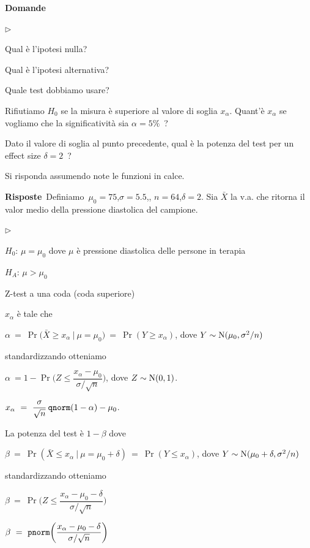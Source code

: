 \documentclass[11pt,openany]{book}
\newcommand{\mylabel}[1]{{\footnotesize\textsf{#1}}\hfill}
\renewenvironment{itemize}
  {\begin{list}{$\triangleright$}{%
   \setlength{\parskip}{0mm}
   \setlength{\topsep}{.2\baselineskip}
   \setlength{\rightmargin}{0mm}
   \setlength{\listparindent}{0mm}
   \setlength{\itemindent}{0mm}
   \setlength{\labelwidth}{3ex}
   \setlength{\itemsep}{.4\baselineskip}
   \setlength{\parsep}{0mm}
   \setlength{\partopsep}{0mm}
   \setlength{\labelsep}{1ex}
   \setlength{\leftmargin}{\labelwidth+\labelsep}
   \let\makelabel\mylabel}}{%
   \end{list}\vspace*{-1.3mm}}
\begin{document}
\textbf{Domande}

\begin{itemize}
\item[1.] Qual è l'ipotesi nulla?
\item[2.] Qual è l'ipotesi alternativa?
\item[3.] Quale test dobbiamo usare?
\item[4.] Rifiutiamo $H_0$ se la misura è superiore al valore di soglia $x_\alpha$. Quant'è $x_\alpha$ se vogliamo che la significatività sia  $\alpha=5\%$~?
\item[5.] Dato il valore di soglia al punto precedente, qual è la potenza del test per un effect size $\delta=2$~? 
\end{itemize}
Si risponda assumendo note le funzioni in calce.

\textbf{Risposte}\  Definiamo\ $\mu_0=75$,\quad $\sigma=5.5$,\quad, $n=64$,\quad $\delta=2$. Sia $\bar X$ la v.a. che ritorna il valor medio della pressione diastolica del campione.

\begin{itemize}
\item[1.] $H_0$: $\mu=\mu_0$ dove $\mu$ è pressione diastolica delle persone in terapia 
\item[2.] $H_A$: $\mu>\mu_0$
\item[3.] Z-test a una coda (coda superiore)
\item[4.] $x_\alpha$ è tale che \medskip

$\alpha\ =\ \Pr\big(\bar X\ge x_\alpha\ \mathbin\big|\ \mu=\mu_0\big)\ =\ \Pr(Y\ge x_\alpha)$, dove $Y\sim {\rm N}(\mu_0,\sigma^2/n)$ \medskip

standardizzando otteniamo \medskip

$\alpha\ =1-\Pr\bigg(Z\le \dfrac{x_\alpha-\mu_0}{\sigma/\sqrt n}\bigg)$, dove $Z\sim {\rm N}(0,1)$.

\hfill $x_\alpha\ =\ \dfrac{\sigma}{\sqrt n}\,{\tt qnorm}(1-\alpha)-\mu_0$.

\item[5.] La potenza del test è $1-\beta$ dove\medskip

$\beta\ =\ \Pr(\bar X\le x_\alpha\ |\ \mu=\mu_0+\delta)\ =\ \Pr(Y\le x_\alpha)$, dove $Y\sim {\rm N}(\mu_0+\delta,\sigma^2/n)$\medskip

standardizzando otteniamo \medskip

$\beta\ =\ \Pr\bigg(Z\le  \dfrac{x_\alpha-\mu_0-\delta}{\sigma/\sqrt n}\bigg)$

\hfill$\beta\ =\  {\tt pnorm}\bigg(\dfrac{x_\alpha-\mu_0-\delta}{\sigma/\sqrt n}\bigg)$

\end{itemize}
\end{document}

